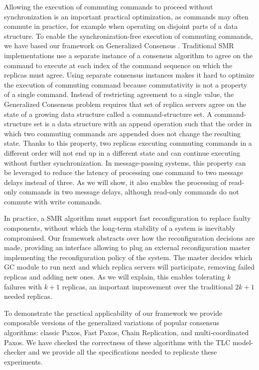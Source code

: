 Allowing the execution of commuting commands to proceed without synchronization is an important practical optimization, as commands may often commute in practice, for example when operating on disjoint parts of a data structure. 
To enable the synchronization-free execution of commuting commands, we have based our framework on Generalized Consensus \cite{Lamport05GeneralizeConsensus}. Traditional SMR implementations use a separate instance of a consensus algorithm to agree on the command to execute at each index of the command sequence on which the replicas must agree. Using separate consensus instances makes it hard to optimize the execution of commuting command because commutativity is not a property of a single command.
Instead of restricting agreement to a single value, the  Generalized Consensus problem requires that set of replica servers agree on the state of a growing data structure called a command-structure set. A command-structure set is a data structure with an append operation such that the order in which two commuting commands are appended does not change the resulting state. Thanks to this property, two replicas executing commuting commands in a different order will
not end up in a different state and can continue executing without further synchronization. In message-passing systems, this property can be leveraged to reduce the latency of processing one command to two message delays instead of three. As we will show, it also enables the processing of read-only commands in two message delays, although read-only commands do not commute with write commands.

In practice, a SMR algorithm must support fast reconfiguration to replace faulty components, without which the long-term stability of a system is inevitably compromised. 
Our framework abstracts over how the reconfiguration decisions are made, providing an interface allowing to plug an external reconfiguration master implementing the reconfiguration policy of the system. The master decides which GC module to run next and which replica servers will participate, removing failed replicas and adding new ones. As we will explain, this enables tolerating $k$ failures with $k+1$ replicas, an important improvement over the traditional $2k+1$ needed replicas. 

To demonstrate the practical applicability of our framework we provide composable versions of the generalized variations of popular consensus algorithms: classic Paxos, Fast Paxos, Chain Replication, and multi-coordinated Paxos. We have checked the correctness of these algorithms with the TLC model-checker and we provide all the specifications needed to replicate these experiments.

